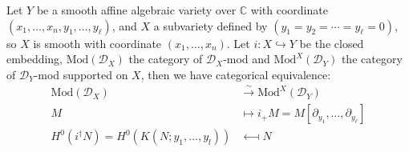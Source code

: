 \begin{theorem}\label{thm:kashiwara_equiv}
    Let $Y$ be a smooth affine algebraic variety over $\mathbb{C}$  with coordinate $(x_{1},\dots,x_{n},y_{1},\dots,y_{\ell})$,
    and $X$ a subvariety defined by $(y_{1}=y_{2}=\cdots=y_{\ell}=0)$,
    so $X$ is smooth with coordinate $(x_{1},\dots,x_{n})$.
    Let $i: X \hookrightarrow Y$ be the closed embedding, $\mathrm{Mod}(\mathcal{D}_{X})$
    the category of $\mathcal{D}_X$-mod and $\mathrm{Mod}^{X}(\mathcal{D}_{Y})$
    the category of $\mathcal{D}_Y$-mod supported on $X$, then we have categorical equivalence:
    \begin{align*}
        \mathrm{Mod}(\mathcal{D}_{X})                        & \xrightarrow{\sim} \mathrm{Mod}^{X}(\mathcal{D}_{Y})               \\
        M                                                    & \longmapsto i_{+}M = M[\partial_{y_{1}},\dots,\partial_{y_{\ell}}] \\
        H^0(i^\dagger N) = H^{0}(K(N; y_{1}, \ldots, y_{l})) & \longmapsfrom N
    \end{align*}
\end{theorem}

